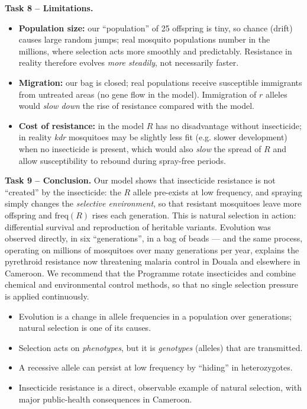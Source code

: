 \documentclass[11pt]{article}
\newcommand{\cle}[1]{{\popxbold\color{popdark}#1}}
\begin{document}
\textbf{Task 8 -- Limitations.}
\begin{itemize}
\item \textbf{Population size:} our ``population'' of 25 offspring is tiny, so chance (drift) causes large random jumps; real mosquito populations number in the millions, where selection acts more smoothly and predictably. Resistance in reality therefore evolves \emph{more steadily}, not necessarily faster.
\item \textbf{Migration:} our bag is closed; real populations receive susceptible immigrants from untreated areas (no gene flow in the model). Immigration of $r$ alleles would \emph{slow down} the rise of resistance compared with the model.
\item \textbf{Cost of resistance:} in the model $R$ has no disadvantage without insecticide; in reality \emph{kdr} mosquitoes may be slightly less fit (e.g. slower development) when no insecticide is present, which would also \emph{slow} the spread of $R$ and allow susceptibility to rebound during spray-free periods.
\end{itemize}

\textbf{Task 9 -- Conclusion.} Our model shows that insecticide resistance is not ``created'' by the insecticide: the $R$ allele pre-exists at low frequency, and spraying simply changes the \emph{selective environment}, so that resistant mosquitoes leave more offspring and $\mathrm{freq}(R)$ rises each generation. This is natural selection in action: differential survival and reproduction of heritable variants. Evolution was observed directly, in six ``generations'', in a bag of beads --- and the same process, operating on millions of mosquitoes over many generations per year, explains the pyrethroid resistance now threatening malaria control in Douala and elsewhere in Cameroon. We recommend that the Programme rotate insecticides and combine chemical and environmental control methods, so that no single selection pressure is applied continuously.

\begin{aretenir}
\begin{itemize}
\item Evolution is a change in \cle{allele frequencies} in a population over generations; natural selection is one of its causes.
\item Selection acts on \emph{phenotypes}, but it is \emph{genotypes} (alleles) that are transmitted.
\item A recessive allele can persist at low frequency by ``hiding'' in heterozygotes.
\item Insecticide resistance is a direct, observable example of natural selection, with major public-health consequences in Cameroon.
\end{itemize}
\end{aretenir}
\end{document}
